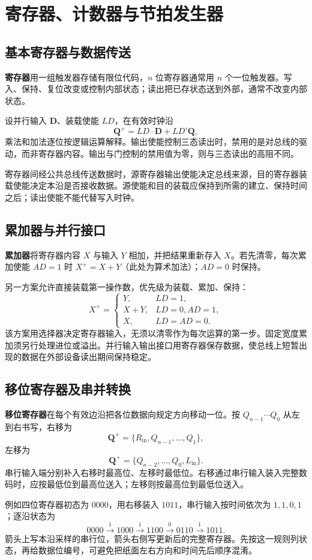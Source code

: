 \documentclass[UTF8,fontset=none,zihao=-4,a4paper]{ctexart}
\newcommand{\chapterpage}[1]{\clearpage\section{#1}}
\newcommand{\term}[1]{\textbf{#1}}
\begin{document}
\chapterpage{寄存器、计数器与节拍发生器}
\subsection{基本寄存器与数据传送}
\term{寄存器}用一组触发器存储有限位代码，$n$ 位寄存器通常用 $n$ 个一位触发器。写入、保持、复位改变或控制内部状态；读出把已存状态送到外部，通常不改变内部状态。

设并行输入 $\symbf D$、装载使能 $LD$，在有效时钟沿
\[
\symbf Q^+=LD\cdot\symbf D+LD'\symbf Q,
\]
乘法和加法逐位按逻辑运算解释。输出使能控制三态读出时，禁用的是对总线的驱动，而非寄存器内容。输出与门控制的禁用值为零，则与三态读出的高阻不同。

寄存器间经公共总线传送数据时，源寄存器输出使能决定总线来源，目的寄存器装载使能决定本沿是否接收数据。源使能和目的装载应保持到所需的建立、保持时间之后；读出使能不能代替写入时钟。

\subsection{累加器与并行接口}
\term{累加器}将寄存器内容 $X$ 与输入 $Y$ 相加，并把结果重新存入 $X$。若先清零，每次累加使能 $AD=1$ 时 $X^+=X+Y$（此处为算术加法）；$AD=0$ 时保持。

另一方案允许直接装载第一操作数，优先级为装载、累加、保持：
\[
X^+=\begin{cases}Y,&LD=1,\\X+Y,&LD=0,AD=1,\\X,&LD=AD=0.\end{cases}
\]
该方案用选择器决定寄存器输入，无须以清零作为每次运算的第一步。固定宽度累加须另行处理进位或溢出。并行输入输出接口用寄存器保存数据，使总线上短暂出现的数据在外部设备读出期间保持稳定。

\subsection{移位寄存器及串并转换}
\term{移位寄存器}在每个有效边沿把各位数据向规定方向移动一位。按 $Q_{n-1}\cdots Q_0$ 从左到右书写，右移为
\[
\symbf Q^+=\{R_{\mathrm{in}},Q_{n-1},\ldots,Q_1\},
\]
左移为
\[
\symbf Q^+=\{Q_{n-2},\ldots,Q_0,L_{\mathrm{in}}\}.
\]
串行输入端分别补入右移时最高位、左移时最低位。右移通过串行输入装入完整数码时，应按最低位到最高位送入；左移则按最高位到最低位送入。

例如四位寄存器初态为 $0000$，用右移装入 $1011$，串行输入按时间依次为 $1,1,0,1$；逐沿状态为
\[
0000\xrightarrow{1}1000\xrightarrow{1}1100\xrightarrow{0}0110\xrightarrow{1}1011.
\]
箭头上写本沿采样的串行位，箭头右侧写更新后的完整寄存器。先按这一规则列状态，再给数据位编号，可避免把纸面左右方向和时间先后顺序混淆。
\end{document}
